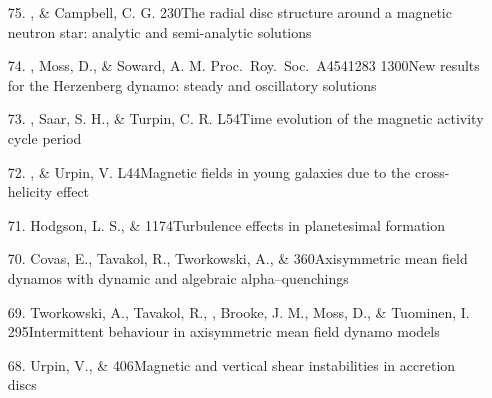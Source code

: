 \begin{itemize}
\item[75.]
\Brandenburg, \& Campbell, C. G.
{230}{The radial disc structure around a magnetic neutron star:
analytic and semi-analytic solutions}

\item[74.]
\Brandenburg, Moss, D., \& Soward, A. M.
{Proc.\ Roy.\ Soc.\ A}{454}{1283}
{1300}{New results for the Herzenberg dynamo: steady and oscillatory solutions}

\item[73.]
\Brandenburg, Saar, S. H., \& Turpin, C. R.
{L54}{Time evolution of the magnetic activity cycle period}

\item[72.]
\Brandenburg, \& Urpin, V.
{L44}{Magnetic fields in young galaxies due to the cross-helicity effect}

\item[71.]
Hodgson, L. S., \& \Brandenburg{}
{1174}{Turbulence effects in planetesimal formation}

\item[70.]
Covas, E., Tavakol, R., Tworkowski, A., \& \Brandenburg{}
{360}{Axisymmetric mean field dynamos with dynamic and algebraic
alpha--quenchings}

\item[69.]
Tworkowski, A., Tavakol, R., \Brandenburg, Brooke, J. M., Moss, D.,
\& Tuominen, I.
{295}{Intermittent behaviour in axisymmetric mean field dynamo models}

\item[68.]
Urpin, V., \& \Brandenburg{}
{406}{Magnetic and vertical shear instabilities in accretion discs}


\end{itemize}
